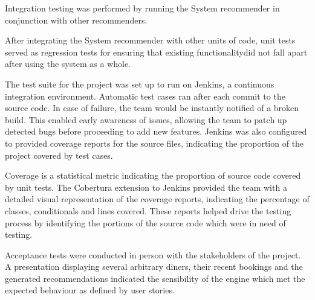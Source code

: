 \documentclass{l3proj}
\begin{document}
Integration testing was performed by running the System recommender in conjunction with other recommenders.

After integrating the System recommender with other units of code, unit tests served as regression tests for ensuring that existing functionalitydid not fall apart after using the system as a whole.

The test suite for the project was set up to run on Jenkins, a continuous integration environment. Automatic test cases ran after each commit to the source code. In case of failure, the team would be instantly notified of a broken build. This enabled early awareness of issues, allowing the team to patch up detected bugs before proceeding to add new features.
Jenkins was also configured to provided coverage reports for the source files, indicating the proportion of the project covered by test cases.

Coverage is a statistical metric indicating the proportion of source code covered by unit tests. 
The Cobertura extension to Jenkins provided the team with a detailed visual representation of the coverage reports, indicating the percentage of classes, conditionals and lines covered. These reports helped drive the testing process by identifying the portions of the source code which were in need of testing.

Acceptance tests were conducted in person with the stakeholders of the project. A presentation displaying several arbitrary diners, their recent bookings and the generated recommendations indicated the sensibility of the engine which met the expected behaviour as defined by user stories.
\end{document}
